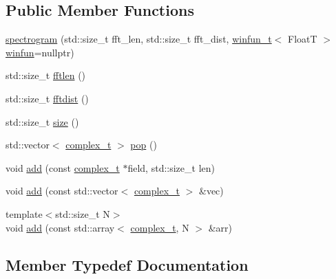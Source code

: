 \subsection*{Public Member Functions}
\begin{DoxyCompactItemize}
\item 
\hyperlink{structdevfix_1_1dsp_1_1spectrogram_a9edbcaca234c9552386ca57cd2d4681c}{spectrogram} (std\+::size\+\_\+t fft\+\_\+len, std\+::size\+\_\+t fft\+\_\+dist, \hyperlink{namespacedevfix_1_1dsp_a6667d1bec03c0d82f87521b87d3fcf24}{winfun\+\_\+t}$<$ FloatT $>$ \hyperlink{structdevfix_1_1dsp_1_1winfun}{winfun}=nullptr)
\item 
std\+::size\+\_\+t \hyperlink{structdevfix_1_1dsp_1_1spectrogram_a0989eec947375fa7696feda0f59c1438}{fftlen} ()
\item 
std\+::size\+\_\+t \hyperlink{structdevfix_1_1dsp_1_1spectrogram_a52a5bc587a41bb8606c7766c58177f57}{fftdist} ()
\item 
std\+::size\+\_\+t \hyperlink{structdevfix_1_1dsp_1_1spectrogram_aa9ac5beddc07be29082a1ef11ff2392b}{size} ()
\item 
std\+::vector$<$ \hyperlink{structdevfix_1_1dsp_1_1spectrogram_a222d1efa23713b334a001e625594b4d4}{complex\+\_\+t} $>$ \hyperlink{structdevfix_1_1dsp_1_1spectrogram_a9fd6a138c1efb217256677a84906109f}{pop} ()
\item 
void \hyperlink{structdevfix_1_1dsp_1_1spectrogram_aa99ba03723f89062409935a8eddfe48e}{add} (const \hyperlink{structdevfix_1_1dsp_1_1spectrogram_a222d1efa23713b334a001e625594b4d4}{complex\+\_\+t} $\ast$field, std\+::size\+\_\+t len)
\item 
void \hyperlink{structdevfix_1_1dsp_1_1spectrogram_a2ad71f3d58619d29de6e655ddc1c2085}{add} (const std\+::vector$<$ \hyperlink{structdevfix_1_1dsp_1_1spectrogram_a222d1efa23713b334a001e625594b4d4}{complex\+\_\+t} $>$ \&vec)
\item 
{\footnotesize template$<$std\+::size\+\_\+t N$>$ }\\void \hyperlink{structdevfix_1_1dsp_1_1spectrogram_afd4fde92b022e1a0a98fa06da03d6e3c}{add} (const std\+::array$<$ \hyperlink{structdevfix_1_1dsp_1_1spectrogram_a222d1efa23713b334a001e625594b4d4}{complex\+\_\+t}, N $>$ \&arr)
\end{DoxyCompactItemize}


\subsection{Member Typedef Documentation}
\mbox{\label{structdevfix_1_1dsp_1_1spectrogram_a222d1efa23713b334a001e625594b4d4}} 
